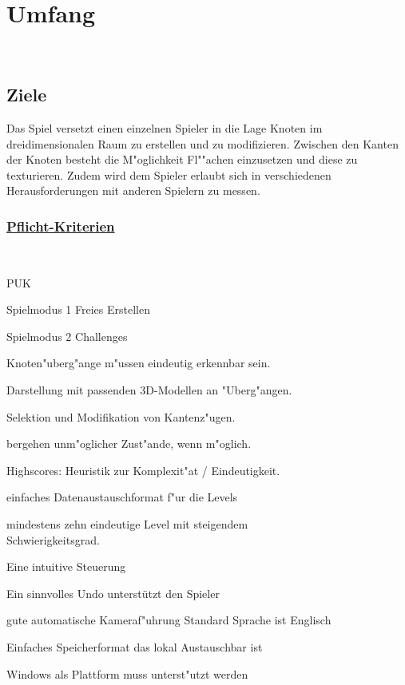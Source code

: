 %
%


\chapter{Umfang}
\label{UF}~\\


%
%
\section{Ziele}
\label{UF:Ziele}

Das Spiel versetzt einen einzelnen Spieler in die Lage Knoten im dreidimensionalen Raum zu erstellen und zu modifizieren. Zwischen den Kanten der Knoten besteht die M{"o}glichkeit Fl{"{"a}}chen einzusetzen und diese zu texturieren. Zudem wird dem Spieler erlaubt sich in verschiedenen Herausforderungen mit anderen Spielern zu messen.\\

% 
%
\subsection*{\underline{Pflicht-Kriterien}}

~\\

\begin{ids}{\gls{PUK}}


		\id[10] Spielmodus 1 Freies Erstellen
		
		\id[20] Spielmodus 2 Challenges
		
		\id[30] Knoten{"u}berg{"a}nge m{"u}ssen eindeutig erkennbar sein.
		
		\id[40] Darstellung mit passenden 3D-Modellen an {"U}berg{"a}ngen.
		
		\id[50] Selektion und Modifikation von Kantenz{"u}gen.
		
		bergehen unm{"o}glicher Zust{"a}nde, wenn m{"o}glich.
		
		\id[70] Highscores: Heuristik zur Komplexit{"a}t / Eindeutigkeit.
		
		\id[80] einfaches Datenaustauschformat f{"u}r die Levels
		
		\id[80] mindestens zehn eindeutige Level mit steigendem \\Schwierigkeitsgrad.
		
		\id[90] Eine intuitive Steuerung 
		
		\id[100] Ein sinnvolles Undo unterstützt den Spieler
		
		\id[110] gute automatische Kameraf{"u}hrung
		\id[120] Standard Sprache ist Englisch
		
	
		\id[130]  Einfaches Speicherformat das lokal Austauschbar ist
		
		\id[140] Windows als Plattform muss unterst{"u}tzt werden

\end{ids}

